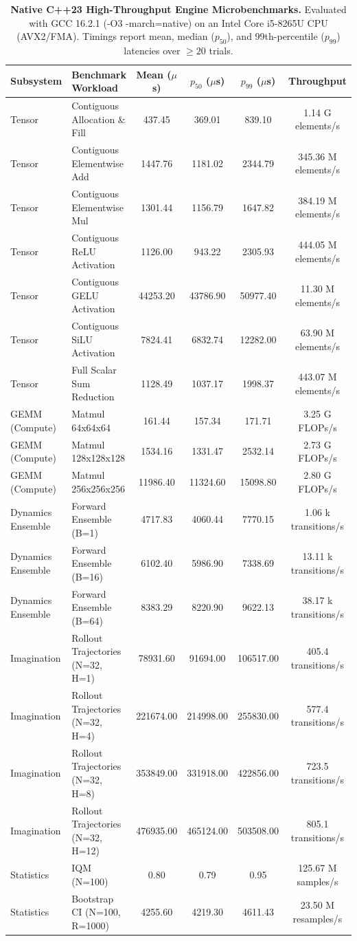 \begin{table}[t]
\centering
\small
\caption{\textbf{Native C++23 High-Throughput Engine Microbenchmarks.} Evaluated with GCC 16.2.1 (-O3 -march=native) on an Intel Core i5-8265U CPU (AVX2/FMA). Timings report mean, median ($p_{50}$), and 99th-percentile ($p_{99}$) latencies over $\ge 20$ trials.}
\label{tab:native_systems_performance}
\begin{tabular}{llcccc}
\toprule
\textbf{Subsystem} & \textbf{Benchmark Workload} & \textbf{Mean} ($\mu$s) & $p_{50}$ ($\mu$s) & $p_{99}$ ($\mu$s) & \textbf{Throughput} \\
\midrule
Tensor & Contiguous Allocation \& Fill & 437.45 & 369.01 & 839.10 & 1.14 G elements/s \\
Tensor & Contiguous Elementwise Add & 1447.76 & 1181.02 & 2344.79 & 345.36 M elements/s \\
Tensor & Contiguous Elementwise Mul & 1301.44 & 1156.79 & 1647.82 & 384.19 M elements/s \\
Tensor & Contiguous ReLU Activation & 1126.00 & 943.22 & 2305.93 & 444.05 M elements/s \\
Tensor & Contiguous GELU Activation & 44253.20 & 43786.90 & 50977.40 & 11.30 M elements/s \\
Tensor & Contiguous SiLU Activation & 7824.41 & 6832.74 & 12282.00 & 63.90 M elements/s \\
Tensor & Full Scalar Sum Reduction & 1128.49 & 1037.17 & 1998.37 & 443.07 M elements/s \\
GEMM (Compute) & Matmul 64x64x64 & 161.44 & 157.34 & 171.71 & 3.25 G FLOPs/s \\
GEMM (Compute) & Matmul 128x128x128 & 1534.16 & 1331.47 & 2532.14 & 2.73 G FLOPs/s \\
GEMM (Compute) & Matmul 256x256x256 & 11986.40 & 11324.60 & 15098.80 & 2.80 G FLOPs/s \\
Dynamics Ensemble & Forward Ensemble (B=1) & 4717.83 & 4060.44 & 7770.15 & 1.06 k transitions/s \\
Dynamics Ensemble & Forward Ensemble (B=16) & 6102.40 & 5986.90 & 7338.69 & 13.11 k transitions/s \\
Dynamics Ensemble & Forward Ensemble (B=64) & 8383.29 & 8220.90 & 9622.13 & 38.17 k transitions/s \\
Imagination & Rollout Trajectories (N=32, H=1) & 78931.60 & 91694.00 & 106517.00 & 405.4 transitions/s \\
Imagination & Rollout Trajectories (N=32, H=4) & 221674.00 & 214998.00 & 255830.00 & 577.4 transitions/s \\
Imagination & Rollout Trajectories (N=32, H=8) & 353849.00 & 331918.00 & 422856.00 & 723.5 transitions/s \\
Imagination & Rollout Trajectories (N=32, H=12) & 476935.00 & 465124.00 & 503508.00 & 805.1 transitions/s \\
Statistics & IQM (N=100) & 0.80 & 0.79 & 0.95 & 125.67 M samples/s \\
Statistics & Bootstrap CI (N=100, R=1000) & 4255.60 & 4219.30 & 4611.43 & 23.50 M resamples/s \\
\bottomrule
\end{tabular}
\end{table}
